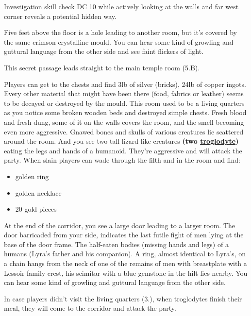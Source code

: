 \documentclass[10pt,onecolumn,twoside,openany,bg=full,layout=true]{dndbook}
\begin{document}
Investigation skill check DC 10 while actively looking at the walls and far west corner reveals a potential hidden way.
\begin{DndReadAloud}
Five feet above the floor is a hole leading to another room, but it's covered by the same crimson crystalline mould.
You can hear some kind of growling and guttural language from the other side and see faint flickers of light.
\end{DndReadAloud}
This secret passage leads straight to the main temple room (5.B).

Players can get to the chests and find 3lb of silver (bricks), 24lb of copper ingots.
Every other material that might have been there (food, fabrics or leather) seems to be decayed or destroyed by the mould.
This room used to be a living quarters as you notice some broken wooden beds and destroyed simple chests.
Fresh blood and fresh dung, some of it on the walls covers the room, and the smell becoming even more aggressive.
Gnawed bones and skulls of various creatures lie scattered around the room.
And you see two tall lizard-like creatures \textbf{(two \href{https://www.dndbeyond.com/monsters/17204-troglodyte}{troglodyte})} eating the legs and hands of a humanoid.
They're aggressive and will attack the party.
When slain players can wade through the filth and in the room and find:
\begin{itemize}
  \item golden ring
  \item golden necklace
  \item 20 gold pieces
\end{itemize}
\begin{DndReadAloud}
At the end of the corridor, you see a large door leading to a larger room.
The door barricaded from your side, indicates the last futile fight of men lying at the base of the door frame.
The half-eaten bodies (missing hands and legs) of a humans (Lyra's father and his companion).
A ring, almost identical to Lyra's, on a chain hangs from the neck of one of the remains of men with breastplate
with a Lessoir family crest, his scimitar with a blue gemstone in the hilt lies nearby.
You can hear some kind of growling and guttural language from the other side.
\end{DndReadAloud}
In case players didn't visit the living quarters (3.), when troglodytes finish their meal, they will come to the corridor and attack the party.
\end{document}
